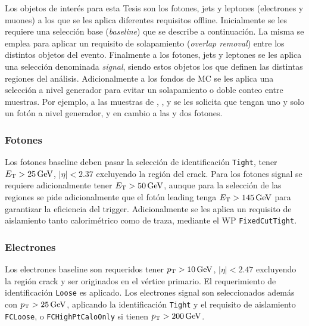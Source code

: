 Los objetos de interés para esta Tesis son los fotones, jets y leptones (electrones y muones) a los que se les aplica diferentes requisitos offline. Inicialmente se les requiere una selección base (\textit{baseline}) 
que se describe a continuación. La misma se emplea para aplicar un requisito de solapamiento (\textit{overlap removal}) entre los distintos objetos del evento.
Finalmente a los fotones, jets y leptones se les aplica una selección denominada \textit{signal}, siendo estos objetos los que definen las distintas regiones del análisis. Adicionalmente a los fondos de MC se les aplica una selección a nivel generador para evitar un solapamiento o doble conteo entre muestras. Por ejemplo, a las muestras de \zph, \wph, \ttbarph y \phj se les solicita que tengan uno y solo un fotón a nivel generador, y en cambio a las \zphph y \wphph dos fotones. 



\subsubsection{Fotones}

Los fotones baseline deben pasar la selección de identificación \texttt{Tight}, tener $E_{\text{T}}>25\,\text{GeV}$, $|\eta|<2.37$ excluyendo la región del crack. Para los fotones signal se requiere adicionalmente tener $E_{\text{T}}>50\,\text{GeV}$, aunque para la selección de las regiones se pide adicionalmente que el fotón leading tenga $E_{\text{T}}>145\,\text{GeV}$ para garantizar la eficiencia del trigger. Adicionalmente se les aplica un requisito de aislamiento tanto calorimétrico como de traza, mediante el WP \texttt{FixedCutTight}.


\subsubsection{Electrones}

Los electrones baseline son requeridos tener $p_{\text{T}}>10\,\text{GeV}$, $|\eta|<2.47$ excluyendo la región crack y ser originados en el vértice primario. El requerimiento de identificación \texttt{Loose}
es aplicado. Los electrones signal son seleccionados además con $p_{\text{T}}>25\,\text{GeV}$, aplicando la identificación \texttt{Tight}
y el requisito de aislamiento \texttt{FCLoose}, o \texttt{FCHighPtCaloOnly} si tienen $p_{\text{T}}>200\,\text{GeV}$.


